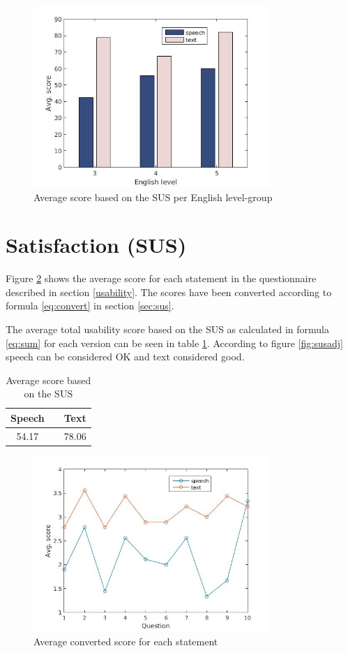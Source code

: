 \begin{figure}[H]
  \centering
  \includegraphics[width=0.8\textwidth]{images/english_score.jpg}
  \caption{Average score based on the SUS per English level-group}\label{eng_score}
\end{figure}

\section{Satisfaction (SUS)}
Figure \ref{fig:sus_table} shows the average score for each statement in the questionnaire described in section \ref{usability}. The scores have been converted according to formula \ref{eq:convert} in section \ref{sec:sus}. 

The average total usability score based on the SUS as calculated in formula \ref{eq:sum} for each version can be seen in table \ref{tot_score}. According to figure \ref{fig:susadj} speech can be considered OK and text considered good.

\begin{table}[ht]
  \centering
  \begin{tabular}{ccc}
    \toprule
    Speech &   & Text\\
    \midrule
    54.17 &   & 78.06\\
    \bottomrule
  \end{tabular}
  \caption{Average score based on the SUS}\label{tot_score}
\end{table}

\begin{figure}[ht]
  \centering
  \includegraphics[width=0.8\textwidth]{images/sus.jpg}
  \caption{Average converted score for each statement}\label{fig:sus_table}
\end{figure}